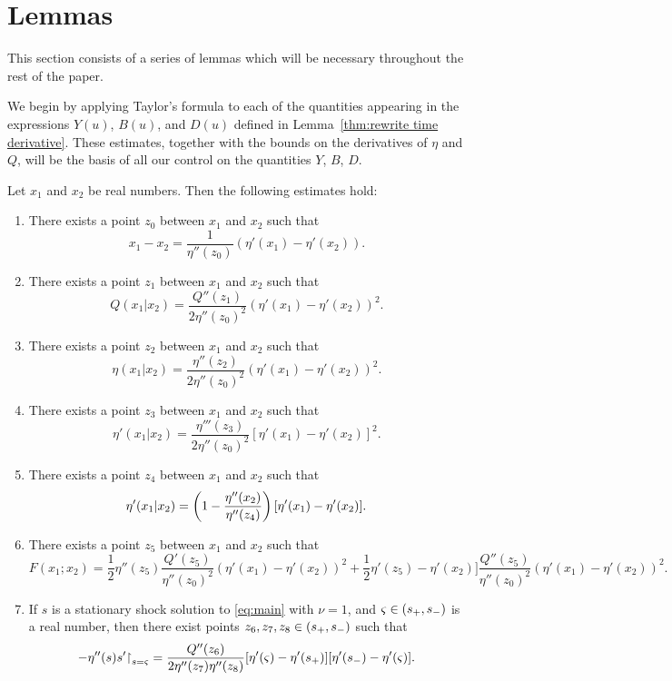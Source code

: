 \section{Lemmas} \label{sec:lemmas}
This section consists of a series of lemmas which will be necessary throughout the rest of the paper.  

We begin by applying Taylor's formula to each of the quantities appearing in the expressions $Y(u)$, $B(u)$, and $D(u)$ defined in Lemma~\ref{thm:rewrite time derivative}.  These estimates, together with the bounds on the derivatives of $\eta$ and $Q$, will be the basis of all our control on the quantities $Y$, $B$, $D$.  

\begin{lemma}\label{thm:taylor}
Let $x_1$ and $x_2$ be real numbers.  Then the following estimates hold:
\begin{enumerate}[label=(\alph*)]
\item \label{taylor u-s}
There exists a point $z_0$ between $x_1$ and $x_2$ such that
\[ x_1-x_2 = \frac{1}{\eta''(z_0)}(\eta'(x_1)-\eta'(x_2)). \]
\item \label{taylor Q}
There exists a point $z_1$ between $x_1$ and $x_2$ such that
\[ Q(x_1|x_2) = \frac{Q''(z_1)}{2\eta''(z_0)^2}(\eta'(x_1)-\eta'(x_2))^2. \]
\item \label{taylor eta}
There exists a point $z_2$ between $x_1$ and $x_2$ such that
\[ \eta(x_1|x_2) = \frac{\eta''(z_2)}{2\eta''(z_0)^2} (\eta'(x_1)-\eta'(x_2))^2. \]
\item \label{taylor eta' thrd}
There exists a point $z_3$ between $x_1$ and $x_2$ such that
\[ \eta'(x_1|x_2) = \frac{\eta'''(z_3)}{2\eta''(z_0)^2} [\eta'(x_1)-\eta'(x_2)]^2. \]
\item \label{taylor eta' scnd}
There exists a point $z_4$ between $x_1$ and $x_2$ such that
\[ \eta'(x_1|x_2) = \left( 1 - \frac{\eta''(x_2)}{\eta''(z_4)} \right)[\eta'(x_1) - \eta'(x_2)]. \]
\item \label{taylor F}
There exists a point $z_5$ between $x_1$ and $x_2$ such that
\[ F(x_1;x_2) = \frac{1}{2}\eta''(z_5) \frac{Q'(z_5)}{\eta''(z_0)^2} (\eta'(x_1)-\eta'(x_2))^2 + \frac{1}{2}\eta'(z_5)-\eta'(x_2)] \frac{Q''(z_5)}{\eta''(z_0)^2} (\eta'(x_1)-\eta'(x_2))^2. \]
\item \label{taylor 1-y2}
If $s$ is a stationary shock solution to \eqref{eq:main} with $\nu = 1$, and $\varsigma \in (s_+,s_-)$ is a real number, then there exist points $z_6, z_7, z_8 \in (s_+,s_-)$ such that
\[ -\eta''(s) s'{\upharpoonright}_{s=\varsigma} = \frac{Q''(z_6)}{2\eta''(z_7) \eta''(z_8)} [\eta'(\varsigma) - \eta'(s_+)][\eta'(s_-) - \eta'(\varsigma)]. \]
\end{enumerate}
\end{lemma}

